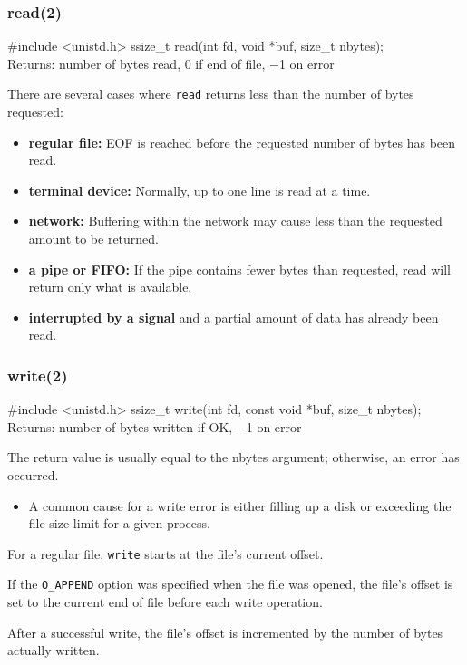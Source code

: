 \documentclass[newPxFont,sthlmFooter,nooffset]{beamer}
\begin{document}
\begin{frame}[containsverbatim,t]
  \frametitle{read(2)}
\begin{codedef}
#include <unistd.h>
ssize_t read(int fd, void *buf, size_t nbytes); \\ Returns: number of bytes read, 0 if end of file, −1 on error
\end{codedef}  

There are several cases where \texttt{read} returns less than the number of bytes requested:
\begin{itemize}
\item \textbf{regular file:} EOF is reached before the requested number of bytes has been read. 
\item \textbf{terminal device:} Normally, up to one line is read at a time. 
\item \textbf{network: } Buffering within the network may cause less than the requested amount to be returned.
\item \textbf{a pipe or FIFO:} If the pipe contains fewer bytes than requested, read will return only what is available.
\item \textbf{interrupted by a signal} and a partial amount of data has already been read. 
\end{itemize}

\end{frame}



\begin{frame}[containsverbatim,t]
  \frametitle{write(2)}
\begin{codedef}
#include <unistd.h>
ssize_t write(int fd, const void *buf, size_t nbytes); \\ Returns: number of bytes written if OK, −1 on error
\end{codedef}  

The return value is usually equal to the nbytes argument; otherwise, an error has occurred. 
\begin{itemize}
  \item A common cause for a write error is either filling up a disk or exceeding the file size limit for a given process.
\end{itemize}
\bigskip

For a regular file, \texttt{write} starts at the file’s current offset. 
\bigskip

If the \texttt{O\_APPEND} option was specified when the file was opened, the file’s offset is set to the current end of file before each write operation. 
\bigskip

After a successful write, the file’s offset is incremented by the number of bytes actually written.
\end{frame}
\end{document}
